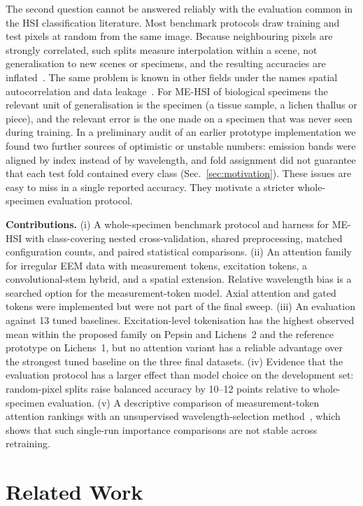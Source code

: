 \documentclass[journal]{IEEEtran}
\begin{document}
The second question cannot be answered reliably with the evaluation common in the HSI classification literature. Most benchmark protocols draw training and test pixels at random from the same image. Because neighbouring pixels are strongly correlated, such splits measure interpolation within a scene, not generalisation to new scenes or specimens, and the resulting accuracies are inflated~\cite{liang2017sampling,nalepa2019validating}. The same problem is known in other fields under the names spatial autocorrelation and data leakage~\cite{roberts2017cv,kapoor2023leakage}. For ME-HSI of biological specimens the relevant unit of generalisation is the specimen (a tissue sample, a lichen thallus or piece), and the relevant error is the one made on a specimen that was never seen during training. In a preliminary audit of an earlier prototype implementation we found two further sources of optimistic or unstable numbers: emission bands were aligned by index instead of by wavelength, and fold assignment did not guarantee that each test fold contained every class (Sec.~\ref{sec:motivation}). These issues are easy to miss in a single reported accuracy. They motivate a stricter whole-specimen evaluation protocol.

\textbf{Contributions.}
(i) A whole-specimen benchmark protocol and harness for ME-HSI with class-covering nested cross-validation, shared preprocessing, matched configuration counts, and paired statistical comparisons.
(ii) An attention family for irregular EEM data with measurement tokens, excitation tokens, a convolutional-stem hybrid, and a spatial extension. Relative wavelength bias is a searched option for the measurement-token model. Axial attention and gated tokens were implemented but were not part of the final sweep.
(iii) An evaluation against 13 tuned baselines. Excitation-level tokenisation has the highest observed mean within the proposed family on Pepsin and Lichens~2 and the reference prototype on Lichens~1, but no attention variant has a reliable advantage over the strongest tuned baseline on the three final datasets.
(iv) Evidence that the evaluation protocol has a larger effect than model choice on the development set: random-pixel splits raise balanced accuracy by 10--12 points relative to whole-specimen evaluation.
(v) A descriptive comparison of measurement-token attention rankings with an unsupervised wavelength-selection method~\cite{meloyan2026unsupervised}, which shows that such single-run importance comparisons are not stable across retraining.
\section{Related Work}
\end{document}
